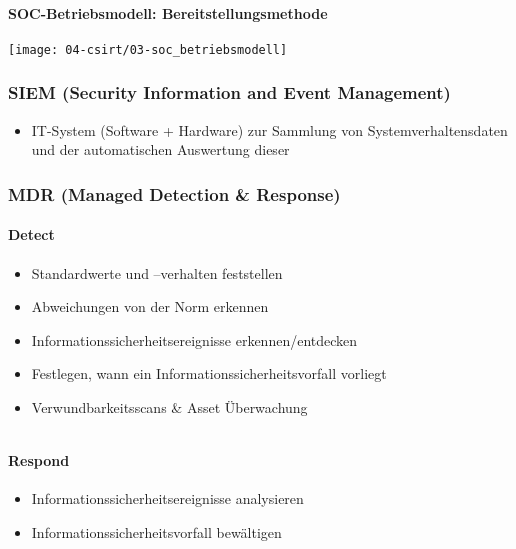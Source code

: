 \paragraph{SOC-Betriebsmodell: Bereitstellungsmethode}
\begin{center}
    \texttt{[image: 04-csirt/03-soc\_betriebsmodell]}
\end{center}

\subsubsection{SIEM (Security Information and Event Management)}
\begin{itemize}
    \item IT-System (Software + Hardware) zur Sammlung von Systemverhaltensdaten und der automatischen Auswertung dieser
\end{itemize}

\subsubsection{MDR (Managed Detection \& Response)}
\begin{minipage}{0.4\linewidth}
    \paragraph{Detect}
    \begin{itemize}
        \item Standardwerte und –verhalten feststellen
        \item Abweichungen von der Norm erkennen
        \item Informationssicherheitsereignisse erkennen/entdecken
        \item Festlegen, wann ein Informationssicherheitsvorfall vorliegt
        \item Verwundbarkeitsscans \& Asset Überwachung
    \end{itemize}
    \vfill
    $ $
\end{minipage}
\begin{minipage}{0.6\linewidth}
    \paragraph{Respond}
    \begin{itemize}
        \item Informationssicherheitsereignisse analysieren
        \item Informationssicherheitsvorfall bewältigen
    \end{itemize}
\end{minipage}

